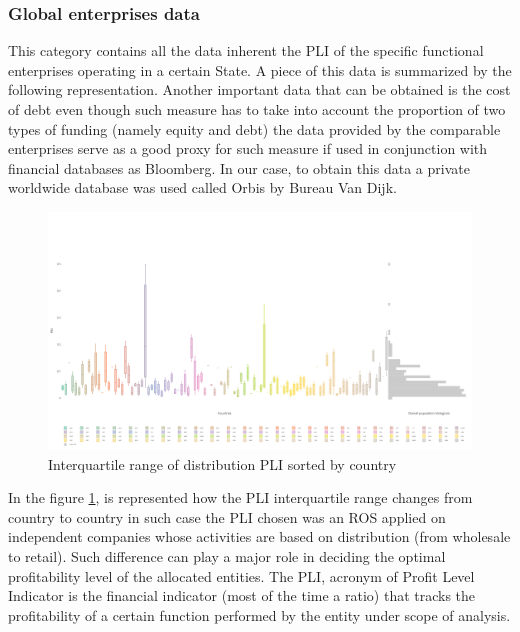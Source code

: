 \documentclass{article}
\begin{document}
\subsubsection{Global enterprises data}
This category contains all the data inherent the PLI of the specific functional enterprises operating in a certain State.
A piece of this data is summarized by the following representation. Another important data that can be obtained is the cost of debt \cite{berman_financial_2013} even though such measure has to take into account the proportion of two types of funding (namely equity and debt) the data provided by the comparable enterprises serve as a good proxy for such measure if used in conjunction with financial databases as Bloomberg. In our case, to obtain this data a private worldwide database was used called Orbis by Bureau Van Dijk.
\begin{figure}
\centering
\includegraphics[width=\textwidth]{Images/plidist.png}
\caption{Interquartile range of distribution PLI sorted by country}
\label{fig:interquartile}
\end{figure}

In the figure \ref{fig:interquartile}, is represented how the PLI interquartile range changes from country to country in such case the PLI chosen was an ROS applied on independent companies whose activities are  based on distribution (from wholesale to retail). Such difference can play a major role in deciding the optimal profitability level of the allocated entities. The PLI, acronym of Profit Level Indicator is the financial indicator (most of the time a ratio) that tracks the profitability of a certain function performed by the entity under scope of analysis.
\end{document}
